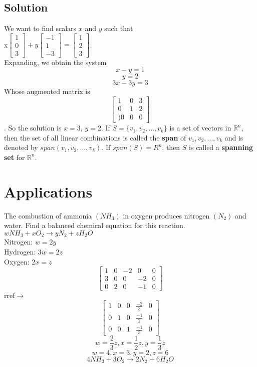 \subsection*{Solution}
We want to find scalars $x$ and $y$ such that\\ 
x$\begin{bmatrix}
    1\\0\\3
\end{bmatrix} + y\begin{bmatrix}
    -1\\1\\-3
\end{bmatrix} = \begin{bmatrix}
    1\\2\\3
\end{bmatrix}$.\\ Expanding, we obtain the system
$$x-y = 1$$ $$y = 2$$ $$3x-3y = 3$$ Whose augmented matrix is $$\begin{bmatrix}
    1&0&3\\0&1&2\\)0&0&0
\end{bmatrix}$$. So the solution is $x=3$, $y=2$.
If $S = \{v_1, v_2, \dots, v_k\}$ is a set of vectors in $\mathbb{R}^n$, then the set of all linear combinations is called the \textbf{span} of $v_1, v_2, \dots, v_k$ and is denoted by $span(v_1, v_2, \dots, v_k)$. If $span(S) = R^n$, then $S$ is called a \textbf{spanning set} for $\mathbb{R}^n$.

\section{Applications}
The combustion of ammonia $(NH_3)$ in oxygen produces nitrogen $(N_2)$ and water. Find a balanced chemical equation for this reaction.
$wNH_3 + xO_2\rightarrow yN_2 + zH_2O$\\
Nitrogen: $w = 2y$\\
Hydrogen: $3w = 2z$\\
Oxygen: $2x = z$\\

$$\begin{bmatrix}
    1&0&-2&0&0\\3&0&0&-2&0\\0&2&0&-1&0
\end{bmatrix}$$ rref$\rightarrow$ $$\begin{bmatrix}
    1&0&0&\frac{-2}{3}&0\\0&1&0&\frac{-1}{2}&0\\0&0&1&\frac{-1}{3}&0
\end{bmatrix}$$
$$w = \frac{2}{3}z, x = \frac{1}{2}z, y = \frac{1}{3}z$$
$$w = 4, x = 3, y = 2, z = 6$$
$$4NH_3+3O_2\rightarrow 2N_2 + 6H_2O$$